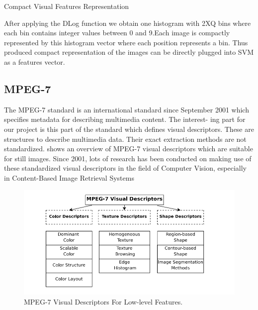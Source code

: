  

 

Compact Visual Features Representation

After applying the DLog function we obtain one histogram with 2XQ bins where each bin contains integer values between 0 and 9.Each image is compactly represented by this histogram vector where each position represents a bin. Thus produced compact representation of the images can be directly plugged into SVM as a features vector.

 

 

\clearpage
\subsection {MPEG-7}



The MPEG-7 standard\cite{Mpeg} is an international standard since September 2001
which speciﬁes metadata for describing multimedia content. The interest-
ing part for our project is this part of the standard which deﬁnes visual
descriptors. These are structures to describe multimedia data. Their exact
extraction methods are not standardized.  shows an overview of
MPEG-7 visual descriptors which are suitable for still images.
Since 2001, lots of research has been conducted on making use of these
standardized visual descriptors in the ﬁeld of Computer Vision, especially in
Content-Based Image Retrieval Systems 
\begin{figure}[h]
  \centering
  \includegraphics[width=6in]{Mpeg7}
  \caption  {MPEG-7 Visual Descriptors For Low-level Features.}
   \label{Mpeg7}
\end{figure}


